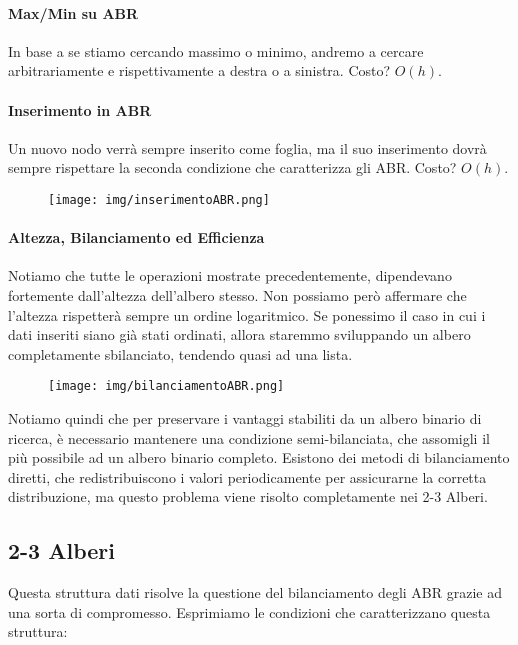 \documentclass{article}
\begin{document}
\newpage

\paragraph{Max/Min su ABR} In base a se stiamo cercando massimo o minimo, andremo a cercare arbitrariamente e rispettivamente a destra o a sinistra. Costo? $O(h)$.

\paragraph{Inserimento in ABR} Un nuovo nodo verrà sempre inserito come foglia, ma il suo inserimento dovrà sempre rispettare la seconda condizione che caratterizza gli ABR. Costo? $O(h)$.

\begin{figure}[htbp]
        \center
        \texttt{[image: img/inserimentoABR.png]}
    \end{figure}

\paragraph{Altezza, Bilanciamento ed Efficienza} Notiamo che tutte le operazioni mostrate precedentemente, dipendevano fortemente dall'altezza dell'albero stesso. Non possiamo però affermare che l'altezza rispetterà sempre un ordine logaritmico. Se ponessimo il caso in cui i dati inseriti siano già stati ordinati, allora staremmo sviluppando un albero completamente sbilanciato, tendendo quasi ad una lista.

\begin{figure}[htbp]
        \center
        \texttt{[image: img/bilanciamentoABR.png]}
    \end{figure}

Notiamo quindi che per preservare i vantaggi stabiliti da un albero binario di ricerca, è necessario mantenere una condizione semi-bilanciata, che assomigli il più possibile ad un albero binario completo. Esistono dei metodi di bilanciamento diretti, che redistribuiscono i valori periodicamente per assicurarne la corretta distribuzione, ma questo problema viene risolto completamente nei 2-3 Alberi.

\newpage

\subsection{2-3 Alberi} Questa struttura dati risolve la questione del bilanciamento degli ABR grazie ad una sorta di compromesso. Esprimiamo le condizioni che caratterizzano questa struttura:
\end{document}
